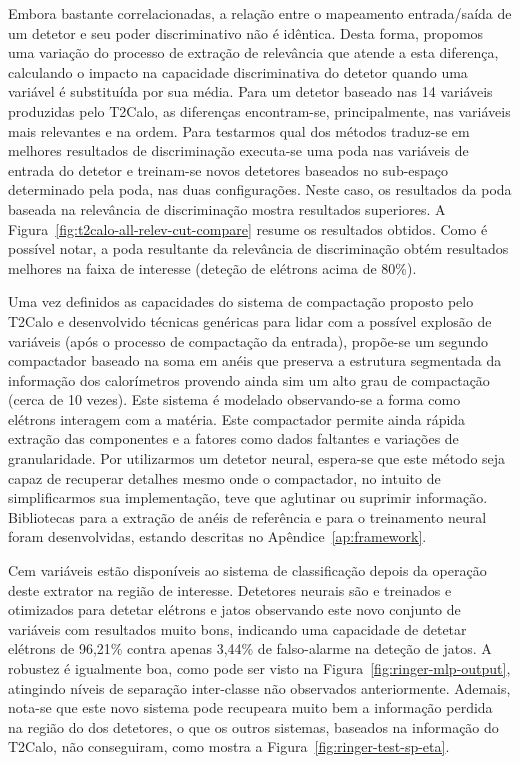 Embora bastante correlacionadas, a relação entre o mapeamento entrada/saída de
um detetor e seu poder discriminativo não é idêntica. Desta forma, propomos
uma variação do processo de extração de relevância que atende a esta
diferença, calculando o impacto na capacidade discriminativa do detetor quando
uma variável é substituída por sua média. Para um detetor baseado nas 14
variáveis produzidas pelo T2Calo, as diferenças encontram-se, principalmente,
nas variáveis mais relevantes e na ordem. Para testarmos qual dos métodos
traduz-se em melhores resultados de discriminação executa-se uma poda nas
variáveis de entrada do detetor e treinam-se novos detetores baseados no
sub-espaço determinado pela poda, nas duas configurações. Neste caso, os
resultados da poda baseada na relevância de discriminação mostra resultados
superiores. A Figura~\ref{fig:t2calo-all-relev-cut-compare} resume os
resultados obtidos. Como é possível notar, a poda resultante da relevância de
discriminação obtém resultados melhores na faixa de interesse (deteção de
elétrons acima de 80\%).

Uma vez definidos as capacidades do sistema de compactação proposto pelo
T2Calo e desenvolvido técnicas genéricas para lidar com a possível explosão de
variáveis (após o processo de compactação da entrada), propõe-se um segundo
compactador baseado na soma em anéis que preserva a estrutura segmentada da
informação dos calorímetros provendo ainda sim um alto grau de compactação
(cerca de 10 vezes). Este sistema é modelado observando-se a forma como
elétrons interagem com a matéria. Este compactador permite ainda rápida
extração das componentes e a fatores como dados faltantes e variações de
granularidade. Por utilizarmos um detetor neural, espera-se que este método
seja capaz de recuperar detalhes mesmo onde o compactador, no intuito de
simplificarmos sua implementação, teve que aglutinar ou suprimir
informação. Bibliotecas para a extração de anéis de referência e para o
treinamento neural foram desenvolvidas, estando descritas no
Apêndice~\ref{ap:framework}.

Cem variáveis estão disponíveis ao sistema de classificação depois da operação
deste extrator na região de interesse. Detetores neurais são e treinados e
otimizados para detetar elétrons e jatos observando este novo conjunto de
variáveis com resultados muito bons, indicando uma capacidade de detetar
elétrons de 96,21\% contra apenas 3,44\% de falso-alarme na deteção de
jatos. A robustez é igualmente boa, como pode ser visto na
Figura~\ref{fig:ringer-mlp-output}, atingindo níveis de separação inter-classe
não observados anteriormente. Ademais, nota-se que este novo sistema pode
recupeara muito bem a informação perdida na região do  dos
detetores, o que os outros sistemas, baseados na informação do T2Calo, não
conseguiram, como mostra a Figura~\ref{fig:ringer-test-sp-eta}. 

